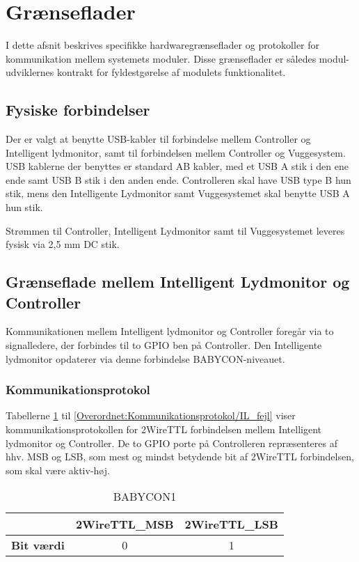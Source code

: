 \section{Grænseflader}
I dette afsnit beskrives specifikke hardwaregrænseflader og protokoller for kommunikation mellem systemets moduler. Disse grænseflader er således modul-udviklernes kontrakt for fyldestgørelse af modulets funktionalitet.

\subsection{Fysiske forbindelser}

Der er valgt at benytte USB-kabler til forbindelse mellem Controller og Intelligent lydmonitor, samt til forbindelsen mellem Controller og Vuggesystem. USB kablerne der benyttes er standard AB kabler, med et USB A stik i den ene ende samt USB B stik i den anden ende. Controlleren skal have USB type B hun stik, mens den Intelligente Lydmonitor samt Vuggesystemet skal benytte USB A hun stik. 

Strømmen til Controller, Intelligent Lydmonitor samt til Vuggesystemet leveres fysisk via 2,5 mm DC stik.

\subsection{Grænseflade mellem Intelligent Lydmonitor og Controller}
\label{overordnet:graenseflade_IL}
Kommunikationen mellem Intelligent lydmonitor og Controller foregår via to signalledere, der forbindes til to GPIO ben på Controller. Den Intelligente lydmonitor opdaterer via denne forbindelse BABYCON-niveauet.  

\subsubsection{Kommunikationsprotokol}
\label{overordnet:Kommunikationsprotokol}

Tabellerne \ref{Overordnet:Kommunikationsprotokol/BABYCON1} til \ref{Overordnet:Kommunikationsprotokol/IL_fejl} viser kommunikationsprotokollen for 2WireTTL forbindelsen mellem Intelligent lydmonitor og Controller. De to GPIO porte på Controlleren repræsenteres af hhv. MSB og LSB, som mest og mindst betydende bit af 2WireTTL forbindelsen, som skal være aktiv-høj.

\begin{table}[H]
	\caption{BABYCON1 }
	\centering
	\begin{tabular}{|l|c|c|}
		\hline 
			&\textbf{2WireTTL\_MSB} & \textbf{2WireTTL\_LSB}     \\ 
		\hline 
		\textbf{Bit værdi} &0 & 1     \\ 
		\hline
	\end{tabular} 
	\label{Overordnet:Kommunikationsprotokol/BABYCON1}
\end{table}

